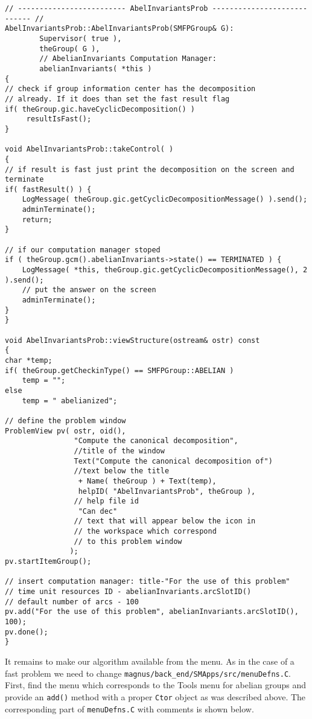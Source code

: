 \documentclass[12pt]{article}
\begin{document}
\footnotesize
\begin{verbatim}
// ------------------------- AbelInvariantsProb ---------------------------- //
AbelInvariantsProb::AbelInvariantsProb(SMFPGroup& G): 
        Supervisor( true ),
        theGroup( G ),
        // AbelianInvariants Computation Manager:
        abelianInvariants( *this )
{
// check if group information center has the decomposition
// already. If it does than set the fast result flag
if( theGroup.gic.haveCyclicDecomposition() )
     resultIsFast();
}

void AbelInvariantsProb::takeControl( )
{
// if result is fast just print the decomposition on the screen and terminate
if( fastResult() ) {
    LogMessage( theGroup.gic.getCyclicDecompositionMessage() ).send();
    adminTerminate();
    return;
}

// if our computation manager stoped
if ( theGroup.gcm().abelianInvariants->state() == TERMINATED ) {
    LogMessage( *this, theGroup.gic.getCyclicDecompositionMessage(), 2 ).send();
    // put the answer on the screen
    adminTerminate();
}
}

void AbelInvariantsProb::viewStructure(ostream& ostr) const
{
char *temp;
if( theGroup.getCheckinType() == SMFPGroup::ABELIAN )
    temp = "";
else
    temp = " abelianized";

// define the problem window
ProblemView pv( ostr, oid(),
                "Compute the canonical decomposition",  
                //title of the window
                Text("Compute the canonical decomposition of")
                //text below the title
                 + Name( theGroup ) + Text(temp),
                 helpID( "AbelInvariantsProb", theGroup ), 
                // help file id
                 "Can dec" 
                // text that will appear below the icon in
                // the workspace which correspond
                // to this problem window
               );
pv.startItemGroup();

// insert computation manager: title-"For the use of this problem"
// time unit resources ID - abelianInvariants.arcSlotID()
// default number of arcs - 100
pv.add("For the use of this problem", abelianInvariants.arcSlotID(), 100);
pv.done();
}

\end{verbatim}
\normalsize

It remains to  make  our algorithm available from the menu.
As in the case of a fast problem  we need to change
{\tt magnus/back\_end/SMApps/src/menuDefns.C}.
First, find the menu which corresponds to the Tools menu for abelian
groups and provide an {\tt add()} method with a
proper {\tt Ctor} object as was described above.
The corresponding part of {\tt menuDefns.C} with comments  is shown below.
\end{document}
